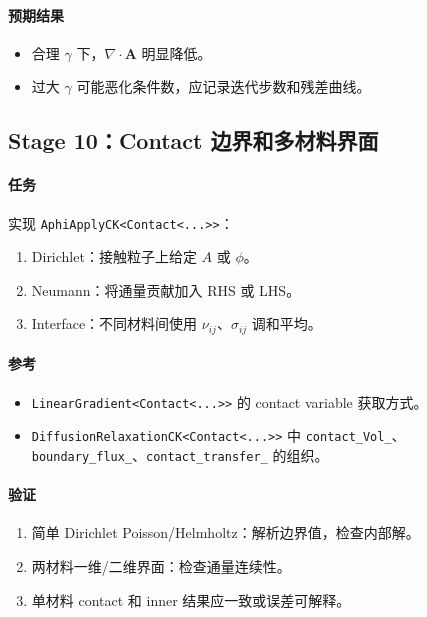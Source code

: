 \documentclass[UTF8,a4paper,11pt]{ctexart}
\newcommand{\code}[1]{\texttt{#1}}
\begin{document}
\paragraph{预期结果}
\begin{itemize}
  \item 合理 $\gamma$ 下，$\nabla\cdot\bm A$ 明显降低。
  \item 过大 $\gamma$ 可能恶化条件数，应记录迭代步数和残差曲线。
\end{itemize}

\subsection{Stage 10：Contact 边界和多材料界面}

\paragraph{任务}
实现 \code{AphiApplyCK<Contact<...>>}：
\begin{enumerate}
  \item Dirichlet：接触粒子上给定 $A$ 或 $\phi$。
  \item Neumann：将通量贡献加入 RHS 或 LHS。
  \item Interface：不同材料间使用 $\nu_{ij}$、$\sigma_{ij}$ 调和平均。
\end{enumerate}

\paragraph{参考}
\begin{itemize}
  \item \code{LinearGradient<Contact<...>>} 的 contact variable 获取方式。
  \item \code{DiffusionRelaxationCK<Contact<...>>} 中 \code{contact\_Vol\_}、\code{boundary\_flux\_}、\code{contact\_transfer\_} 的组织。
\end{itemize}

\paragraph{验证}
\begin{enumerate}
  \item 简单 Dirichlet Poisson/Helmholtz：解析边界值，检查内部解。
  \item 两材料一维/二维界面：检查通量连续性。
  \item 单材料 contact 和 inner 结果应一致或误差可解释。
\end{enumerate}
\end{document}
